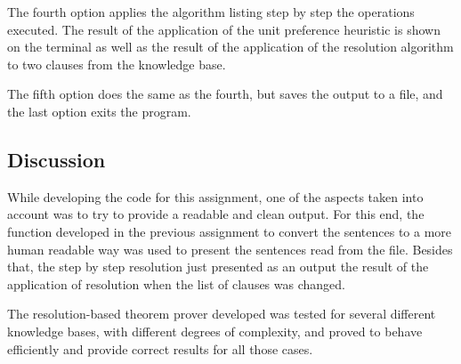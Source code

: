 \documentclass[11pt,journal,compsoc]{IEEEtran}
\begin{document}
The fourth option applies the algorithm listing step by step the operations executed. The result of the application of the unit preference heuristic is shown on the terminal as well as the result of the application of the resolution algorithm to two clauses from the knowledge base.

The fifth option does the same as the fourth, but saves the output to a file, and the last option exits the program.


\subsection{Discussion}

While developing the code for this assignment, one of the aspects taken into account was to try to provide a readable and clean output. For this end, the function developed in the previous assignment to convert the sentences to a more human readable way was used to present the sentences read from the file. Besides that, the step by step resolution just presented as an output the result of the application of resolution when the list of clauses was changed.

The resolution-based theorem prover developed was tested for several different knowledge bases, with different degrees of complexity, and proved to behave efficiently and provide correct results for all those cases.




%
%
%

\onecolumn
\end{document}
